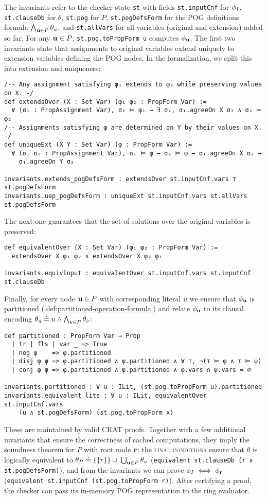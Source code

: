 The invariants refer to the checker state \lstinline{st} with fields \lstinline{st.inputCnf} for $\phi_I$, \lstinline{st.clauseDb} for $\theta$, \lstinline{st.pog} for $P$, \lstinline{st.pogDefsForm} for the POG definitions formula $\bigwedge_{\mathbf{u}\in P}\theta_u$, and \lstinline{st.allVars} for all variables (original and extension) added so far. For any $\mathbf{u}\in P$, \lstinline{st.pog.toPropForm u} computes $\phi_{\mathbf{u}}$. The first two invariants state that assignments to original variables extend uniquely to extension variables defining the POG nodes. In the formalization, we split this into extension and uniqueness:
\begin{lstlisting}
/-- Any assignment satisfying φ₁ extends to φ₂ while preserving values on X. -/
def extendsOver (X : Set Var) (φ₁ φ₂ : PropForm Var) :=
  ∀ (σ₁ : PropAssignment Var), σ₁ ⊨ φ₁ → ∃ σ₂, σ₁.agreeOn X σ₂ ∧ σ₂ ⊨ φ₂
/-- Assignments satisfying φ are determined on Y by their values on X. -/
def uniqueExt (X Y : Set Var) (φ : PropForm Var) :=
  ∀ (σ₁ σ₂ : PropAssignment Var), σ₁ ⊨ φ → σ₂ ⊨ φ → σ₁.agreeOn X σ₂ →
    σ₁.agreeOn Y σ₂

invariants.extends_pogDefsForm : extendsOver st.inputCnf.vars ⊤ st.pogDefsForm
invariants.uep_pogDefsForm : uniqueExt st.inputCnf.vars st.allVars st.pogDefsForm
\end{lstlisting}
The next one guarantees that the set of solutions over the original variables is preserved:
\begin{lstlisting}
def equivalentOver (X : Set Var) (φ₁ φ₂ : PropForm Var) :=
  extendsOver X φ₁ φ₂ ∧ extendsOver X φ₂ φ₁

invariants.equivInput : equivalentOver st.inputCnf.vars st.inputCnf st.clauseDb
\end{lstlisting}
Finally, for every node $\mathbf{u}\in P$ with corresponding literal $u$ we ensure that $\phi_{\mathbf{u}}$ is partitioned (\cref{def:partitioned-operation-formula}) and relate $\phi_{\mathbf{u}}$ to its clausal encoding $\theta_u \doteq u \wedge \bigwedge_{\mathbf{v}\in P}\theta_v$:
\begin{lstlisting}
def partitioned : PropForm Var → Prop
  | tr | fls | var _ => True
  | neg φ    => φ.partitioned
  | disj φ ψ => φ.partitioned ∧ ψ.partitioned ∧ ∀ τ, ¬(τ ⊨ φ ∧ τ ⊨ ψ)
  | conj φ ψ => φ.partitioned ∧ ψ.partitioned ∧ φ.vars ∩ ψ.vars = ∅

invariants.partitioned : ∀ u : ILit, (st.pog.toPropForm u).partitioned
invariants.equivalent_lits : ∀ u : ILit, equivalentOver st.inputCnf.vars
    (u ∧ st.pogDefsForm) (st.pog.toPropForm x)
\end{lstlisting}
These are maintained by valid CRAT proofs. Together with a few additional invariants
that ensure the correctness of cached computations, they imply the soundness theorem for $P$ with root
node $\mathbf{r}$: the \textsc{final conditions} ensure that $\theta$ is logically equivalent to
$\theta_P \doteq \{\{r\}\} \cup \; \bigcup_{\mathbf{u} \in P} \theta_{u}$
(\lstinline{equivalent st.clauseDb (r ∧ st.pogDefsForm)}), and from the invariants we can prove
$\phi_I \iff \phi_{\mathbf{r}}$ (\lstinline{equivalent st.inputCnf (st.pog.toPropForm r)}).
After certifying a proof, the checker can pass its in-memory POG representation to the ring evaluator.

